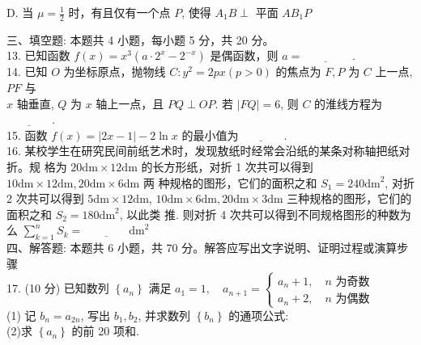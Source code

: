 \documentclass[UTF8]{ctexart}
\begin{document}
	D. 当 $\mu=\frac{1}{2}$ 时，有且仅有一个点 $P$, 使得 $A_{1} B \perp$ 平面 $A B_{1} P$\\
	\newpage
	
	三、填空题: 本题共 4 小题，每小题 5 分，共 20 分。\\
	
	13. 已知函数 $f(x)=x^{3}\left(a \cdot 2^{x}-2^{-x}\right)$ 是偶函数，则 $a=\underline{\qquad\qquad}$ .\\
	
	14. 已知 $O$ 为坐标原点，抛物线 $C: y^{2}=2 p x(p>0)$ 的焦点为 $F, P$ 为 $C$ 上一点, $P F$ 与\\
	
	$x$ 轴垂直, $Q$ 为 $x$ 轴上一点，且 $P Q \perp O P .$ 若 $|F Q|=6$, 则 $C$ 的淮线方程为$ \underline{\qquad\qquad} $.\\
	
	15. 函数 $f(x)=|2 x-1|-2 \ln x$ 的最小值为$ \underline{\qquad\qquad} $.\\
	
	16. 某校学生在研究民间前纸艺术时，发现敖纸时经常会沿纸的某条对称轴把纸对折。规
	格为 $20 \mathrm{dm} \times 12 \mathrm{dm}$ 的长方形纸，对折 1 次共可以得到 $10 \mathrm{dm} \times 12 \mathrm{dm}, 20 \mathrm{dm} \times 6 \mathrm{dm}$ 两
	种规格的图形，它们的面积之和 $S_{1}=240 \mathrm{dm}^{2}$, 对折 2 次共可以得到 $5 \mathrm{dm} \times 12 \mathrm{dm}$,
	$10 \mathrm{dm} \times 6 \mathrm{dm}, 20 \mathrm{dm} \times 3 \mathrm{dm}$ 三种规格的图形，它们的面积之和 $S_{2}=180 \mathrm{dm}^{2}$, 以此类
	推. 则对折 4 次共可以得到不同规格图形的种数为
	么 $\displaystyle{\sum_{k=1}^{n} S_{k}}=$$ \underline{\qquad\qquad} \mathrm{dm}^{2}$\\
	
	四、解答题: 本题共 6 小题，共 70 分。解答应写出文字说明、证明过程或演算步骤\\
	
	17. (10 分)
	已知数列 $\left\{a_{n}\right\}$ 满足 $a_{1}=1, \quad a_{n+1}=\left\{\begin{array}{l}a_{n}+1, \quad n \text { 为奇数 } \\ a_{n}+2, \quad n \text { 为偶数 }\end{array}\right.$\\
	
	(1) 记 $b_{n}=a_{2 n}$, 写出 $b_{1}, b_{2}$, 并求数列 $\left\{b_{n}\right\}$ 的通项公式:\\
	
	(2)求 $\left\{a_{n}\right\}$ 的前 20 项和.\\
	
\end{document}
